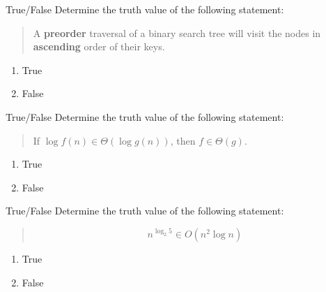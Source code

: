 \documentclass[9pt]{beamer}
\begin{document}
\begin{frame}[fragile]{True/False}
  Determine the truth value of the following statement:

  \begin{quote}
    A {\bf preorder} traversal of a binary search tree will visit the nodes
    in {\bf ascending} order of their keys.
  \end{quote}

  \begin{enumerate}
    \item
      True
    \item
      \alert<2->{False}
  \end{enumerate}

\end{frame}

\begin{frame}[fragile]{True/False}
  Determine the truth value of the following statement:

  \begin{quote}
    If $\log{f(n)} \in \Theta(\log{g(n)})$, then $f\in \Theta(g)$.
  \end{quote}

  \begin{enumerate}
    \item
      True
    \item
      \alert<2->{False}
  \end{enumerate}

\end{frame}

\begin{frame}[fragile]{True/False}
  Determine the truth value of the following statement:

  \begin{quote}
    \[n^{\log_2{5}} \in O(n^2\log{n})\]
  \end{quote}

  \begin{enumerate}
    \item
      True
    \item
      \alert<2->{False}
  \end{enumerate}

\end{frame}
\end{document}
